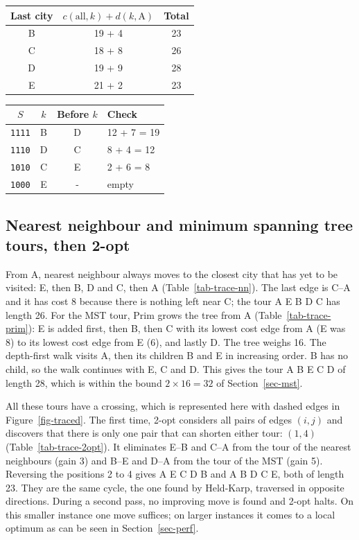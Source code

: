 \documentclass[10pt,a4paper]{article}
\begin{document}
\begin{minipage}[t]{0.41\linewidth}
\vspace{0pt}
\centering\scriptsize
\begin{tabular}{@{}c c c@{}}
\toprule
Last city & $c(\mathrm{all}, k) + d(k, \mathrm{A})$ & Total \\
\midrule
B & 19 + 4 & 23 \\
C & 18 + 8 & 26 \\
D & 19 + 9 & 28 \\
E & 21 + 2 & 23 \\
\bottomrule
\end{tabular}
\label{tab-trace-close}

\medskip
\begin{tabular}{@{}c c c l@{}}
\toprule
$S$ & $k$ & Before $k$ & Check \\
\midrule
\texttt{1111} & B & D & 12 + 7 = 19 \\
\texttt{1110} & D & C & 8 + 4 = 12 \\
\texttt{1010} & C & E & 2 + 6 = 8 \\
\texttt{1000} & E & - & empty \\
\bottomrule
\end{tabular}
\label{tab-trace-back}
\end{minipage}

\subsection{Nearest neighbour and minimum spanning tree tours, then 2-opt}

From A, nearest neighbour always moves to the closest city that has yet to be visited: E, then B, D and C, then A (Table~\ref{tab-trace-nn}). The last edge is C--A and it has cost 8 because there is nothing left near C; the tour A E B D C has length 26. For the MST tour, Prim grows the tree from A (Table~\ref{tab-trace-prim}): E is added first, then B, then C with its lowest cost edge from A (E was 8) to its lowest cost edge from E (6), and lastly D. The tree weighs 16. The depth-first walk visits A, then its children B and E in increasing order. B has no child, so the walk continues with E, C and D. This gives the tour A B E C D of length 28, which is within the bound $2 \times 16 = 32$ of Section~\ref{sec-mst}.

All these tours have a crossing, which is represented here with dashed edges in Figure~\ref{fig-traced}. The first time, 2-opt considers all pairs of edges $(i, j)$ and discovers that there is only one pair that can shorten either tour: $(1, 4)$ (Table~\ref{tab-trace-2opt}). It eliminates E--B and C--A from the tour of the nearest neighbours (gain 3) and B--E and D--A from the tour of the MST (gain 5). Reversing the positions 2 to 4 gives A E C D B and A B D C E, both of length 23. They are the same cycle, the one found by Held-Karp, traversed in opposite directions. During a second pass, no improving move is found and 2-opt halts. On this smaller instance one move suffices; on larger instances it comes to a local optimum as can be seen in Section~\ref{sec-perf}.
\end{document}
